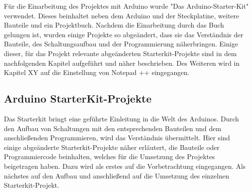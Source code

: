 Für die Einarbeitung des Projektes mit Arduino wurde "Das Arduino-Starter-Kit" verwendet. Dieses beinhaltet neben dem Arduino und der Steckplatine, weitere Bauteile und ein Projektbuch. Nachdem die Einarbeitung durch das Buch gelungen ist, wurden einige Projekte so abgeändert, dass sie das Verständnis der Bauteile, des Schaltungsaufbau und der Programmierung näherbringen. Einige dieser, für das Projekt relevante abgeänderten Starterkit-Projekte sind in dem nachfolgenden Kapitel aufgeführt und näher beschrieben. Des Weiteren wird in Kapitel XY auf die Einstellung von Notepad ++ eingegangen.




\subsection{Arduino StarterKit-Projekte}

Das Starterkit bringt eine geführte Einleitung in die Welt des Arduinos. Durch den Aufbau von Schaltungen mit den entsprechenden Bauteilen und dem anschließenden Programmieren, wird das Verständnis übermittelt.
Hier sind einige abgeänderte Starterkit-Projekte näher erläutert, die Bauteile oder Programmiercode beinhalten, welches für die Umsetzung des  Projektes beigetragen haben. Dazu wird als erstes auf die Vorbetrachtung eingegangen. Als nächstes auf den Aufbau und anschließend auf die Umsetzung des einzelnen Starterkit-Projekt.


